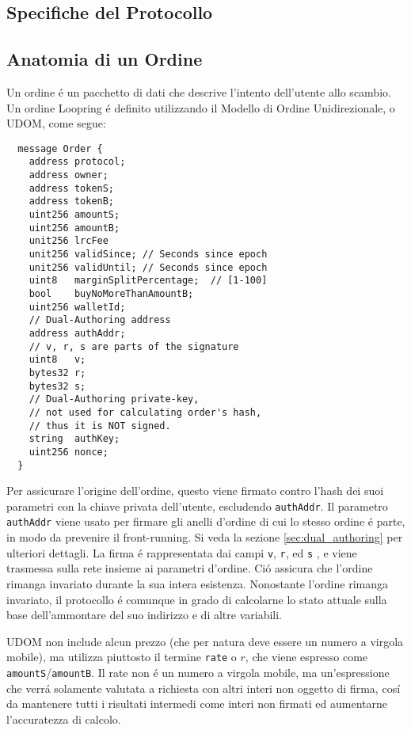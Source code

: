 \documentclass[UTF8,nofonts]{article}
\begin{document}
\begin{multicols}{2}
\section{Specifiche del Protocollo\label{sec:protocol}}

\subsection{Anatomia di un Ordine\label{anatomy}}
Un ordine \'e un pacchetto di dati che descrive l'intento dell'utente allo scambio. Un ordine Loopring  \'e definito utilizzando il Modello di Ordine Unidirezionale, o UDOM, come segue:

\begin{verbatim}
  message Order {
    address protocol;
    address owner;
    address tokenS;
    address tokenB;
    uint256 amountS;
    uint256 amountB;
    unit256 lrcFee
    unit256 validSince; // Seconds since epoch
    unit256 validUntil; // Seconds since epoch
    uint8   marginSplitPercentage;  // [1-100]
    bool    buyNoMoreThanAmountB;
    uint256 walletId;
    // Dual-Authoring address
    address authAddr;
   	// v, r, s are parts of the signature
    uint8   v;
    bytes32 r;
    bytes32 s;
    // Dual-Authoring private-key,
    // not used for calculating order's hash,
    // thus it is NOT signed.
    string  authKey;
    uint256 nonce;
  }
\end{verbatim}


Per assicurare l'origine dell'ordine, questo viene firmato contro l'hash dei suoi parametri con la chiave privata dell'utente, escludendo \verb|authAddr|. Il parametro \verb|authAddr| viene usato per firmare gli anelli d'ordine di cui lo stesso ordine \'e parte, in modo da prevenire il front-running. Si veda la sezione \ref{sec:dual_authoring} per ulteriori dettagli. La firma \'e rappresentata dai campi \verb|v|, \verb|r|, ed \verb|s| , e viene trasmessa sulla rete insieme ai parametri d'ordine. Ci\'o assicura che l'ordine rimanga invariato durante la sua intera esistenza. Nonostante l'ordine rimanga invariato, il protocollo \'e comunque in grado di calcolarne lo stato attuale sulla base dell'ammontare del suo indirizzo e di altre variabili.


UDOM non include alcun prezzo (che per natura deve essere un numero a virgola mobile), ma utilizza piuttosto il termine \verb|rate| o $r$, che viene espresso come \verb|amountS|/\verb|amountB|. Il rate non \'e un numero a virgola mobile, ma un'espressione che verr\'a solamente valutata a richiesta con altri interi non oggetto di firma, cos\'i da mantenere tutti i risultati intermedi come interi non firmati ed aumentarne l'accuratezza di calcolo.


\end{multicols}
\end{document}

